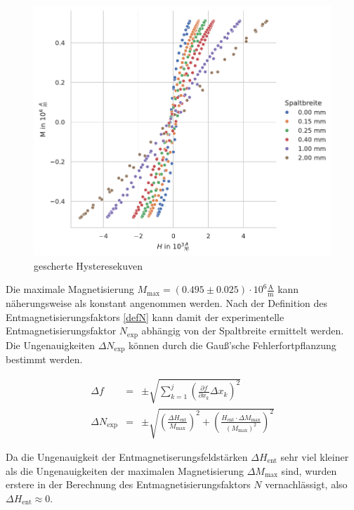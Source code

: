 \documentclass[12pt,a4paper]{scrartcl}
\numberwithin{equation}{section} %
\renewcommand{\[}{} %
\renewcommand{\]}{\noindent} %
\begin{document}
\begin{figure}
\centering
\includegraphics[scale=0.7]{../media/B2.4/3.3.3_overview.pdf}
\caption{gescherte Hysteresekuven}
\label{Abb: Scherung}
\end{figure}

Die maximale Magnetisierung \(M_\mathrm{max} = (0.495\pm 0.025) \cdot 10^6 \mathrm{\frac{A}{m}}\) kann näherungsweise als konstant angenommen werden. Nach der Definition des Entmagnetisierungsfaktors \eqref{defN} kann damit der experimentelle Entmagnetisierungsfaktor \(N_\mathrm{exp}\) abhängig von der Spaltbreite ermittelt werden. Die Ungenauigkeiten \(\Delta N_\mathrm{exp}\) können durch die Gauß'sche Fehlerfortpflanzung bestimmt werden.

\begin{eqnarray}
    \Delta f &=& \pm\sqrt{
        \sum_{k=1}^j
            \left(
                \frac{\partial f}{\partial x_k} \Delta x_k
            \right)^2
        } \\
    \Delta N_\mathrm{exp} &=&
        \pm\sqrt{
            \left(\frac{\Delta H_\mathrm{ent}}{M_\mathrm{max}}\right)^2
            + \left(\frac{H_\mathrm{ent}\cdot \Delta M_\mathrm{max}}{(M_\mathrm{max})^2}\right)^2       }
\end{eqnarray}

\noindent
Da die Ungenauigkeit der Entmagnetiserungsfeldstärken \(\Delta H_\mathrm{ent}\) sehr viel kleiner als die Ungenauigkeiten der maximalen Magnetisierung \(\Delta M_\mathrm{max}\) sind, wurden erstere in der Berechnung des Entmagnetisierungsfaktors \(N\) vernachlässigt, also \(\Delta H_\mathrm{ent}\approx 0\).
\end{document}
